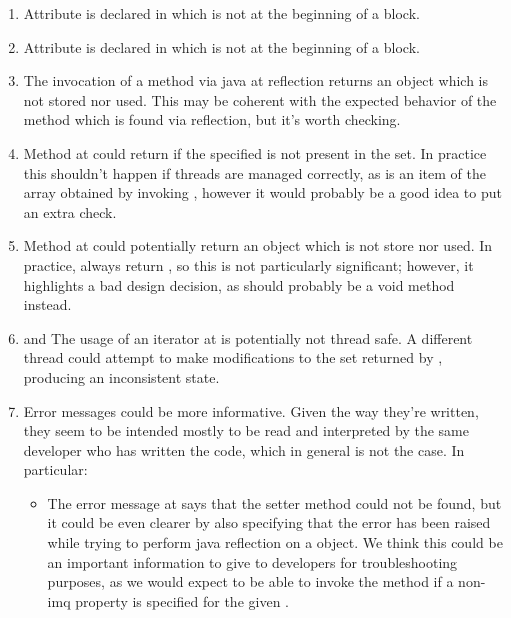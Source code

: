 \begin{enumerate}
	\item {} Attribute  is declared in  which is not at the beginning of a block. 
	\item {} Attribute  is declared in  which is not at the beginning of a block.
	\item {} The invocation of a method via java at  reflection returns an  object which is not stored nor used. This may be coherent with the expected behavior of the  method which is found via reflection, but it's worth checking. 
	\item {} Method  at  could return  if the specified  is not present in the  set. In practice this shouldn't happen if threads are managed correctly, as  is an item of the array obtained by invoking , however it would probably be a good idea to put an extra check. 
	\item {} Method  at  could potentially return an  object which is not store nor used. In practice,  always return , so this is not particularly significant; however, it highlights a bad design decision, as  should probably be a void method instead. 
	\item {} and  The usage of an iterator at  is potentially not thread safe. A different thread could attempt to make modifications to the set returned by , producing an inconsistent state. 
	\item {} Error messages could be more informative. Given the way they're written, they seem to be intended mostly to be read and interpreted by the same developer who has written the code, which in general is not the case. In particular:
		\begin{itemize}
			\item The error message at  says that the setter method could not be found, but it could be even clearer by also specifying that the error has been raised while trying to perform java reflection on a  object. We think this could be an important information to give to developers for troubleshooting purposes, as we would expect to be able to invoke the  method if a non- imq property is specified for the given . 

\end{itemize}
\end{enumerate}
